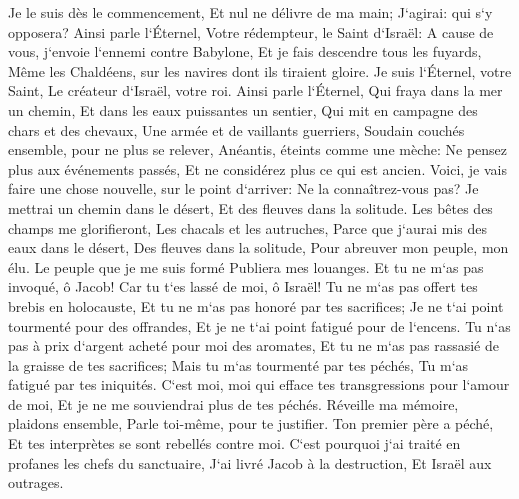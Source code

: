 \verse Je le suis dès le commencement, Et nul ne délivre de ma main; J`agirai: qui s`y opposera? 
\verse Ainsi parle l`Éternel, Votre rédempteur, le Saint d`Israël: A cause de vous, j`envoie l`ennemi contre Babylone, Et je fais descendre tous les fuyards, Même les Chaldéens, sur les navires dont ils tiraient gloire. 
\verse Je suis l`Éternel, votre Saint, Le créateur d`Israël, votre roi. 
\verse Ainsi parle l`Éternel, Qui fraya dans la mer un chemin, Et dans les eaux puissantes un sentier, 
\verse Qui mit en campagne des chars et des chevaux, Une armée et de vaillants guerriers, Soudain couchés ensemble, pour ne plus se relever, Anéantis, éteints comme une mèche: 
\verse Ne pensez plus aux événements passés, Et ne considérez plus ce qui est ancien. 
\verse Voici, je vais faire une chose nouvelle, sur le point d`arriver: Ne la connaîtrez-vous pas? Je mettrai un chemin dans le désert, Et des fleuves dans la solitude. 
\verse Les bêtes des champs me glorifieront, Les chacals et les autruches, Parce que j`aurai mis des eaux dans le désert, Des fleuves dans la solitude, Pour abreuver mon peuple, mon élu. 
\verse Le peuple que je me suis formé Publiera mes louanges. 
\verse Et tu ne m`as pas invoqué, ô Jacob! Car tu t`es lassé de moi, ô Israël! 
\verse Tu ne m`as pas offert tes brebis en holocauste, Et tu ne m`as pas honoré par tes sacrifices; Je ne t`ai point tourmenté pour des offrandes, Et je ne t`ai point fatigué pour de l`encens. 
\verse Tu n`as pas à prix d`argent acheté pour moi des aromates, Et tu ne m`as pas rassasié de la graisse de tes sacrifices; Mais tu m`as tourmenté par tes péchés, Tu m`as fatigué par tes iniquités. 
\verse C`est moi, moi qui efface tes transgressions pour l`amour de moi, Et je ne me souviendrai plus de tes péchés. 
\verse Réveille ma mémoire, plaidons ensemble, Parle toi-même, pour te justifier. 
\verse Ton premier père a péché, Et tes interprètes se sont rebellés contre moi. 
\verse C`est pourquoi j`ai traité en profanes les chefs du sanctuaire, J`ai livré Jacob à la destruction, Et Israël aux outrages. 

